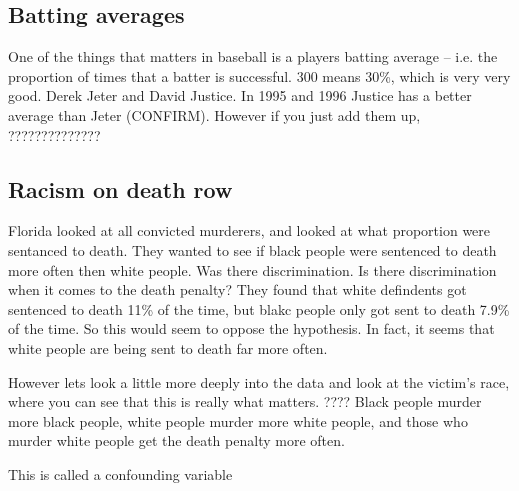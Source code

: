 \subsection{Batting averages}
\todo One of the things that matters in baseball is a players batting average -- i.e. the proportion of times that a batter is successful. 300 means 30\%, which is very very good. Derek Jeter and David Justice. In 1995 and 1996 Justice has a better average than Jeter (CONFIRM). However if you just add them up, 
??????????????
\subsection{Racism on death row}
\todo Florida looked at all convicted murderers, and looked at what proportion were sentanced to death. They wanted to see if black people were sentenced to death more often then white people. Was there discrimination. Is there discrimination when it comes to the death penalty? They found that white defindents got sentenced to death 11\% of the time, but blakc people only got sent to death 7.9\% of the time. So this would seem to oppose the hypothesis. In fact, it seems that white people are being sent to death far more often. 

However lets look a little more deeply into the data and look at the victim's race, where you can see that this is really what matters. ???? Black people murder more black people, white people murder more white people, and those who murder white people get the death penalty more often. 

This is called a confounding variable






